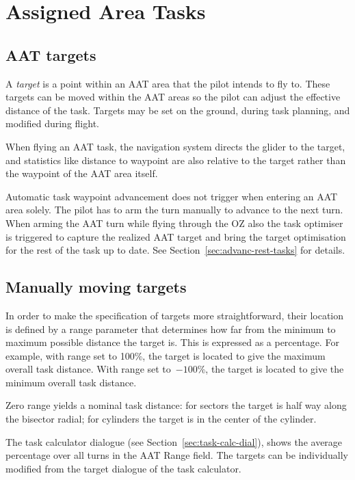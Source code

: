 \section{Assigned Area Tasks}\label{sec:aat-tasks}

\subsection*{AAT targets}

A \emph{target} is a point within an AAT area that the pilot intends to
fly to.  These targets can be moved within the AAT areas so the pilot
can adjust the effective distance of the task.  Targets may be set on
the ground, during task planning, and modified during flight.

When flying an AAT task, the navigation system directs the glider to
the target, and statistics like distance to waypoint are also relative
to the target rather than the waypoint of the AAT area itself.

Automatic task waypoint advancement does not trigger when entering an
AAT area solely. The pilot has to arm the turn manually to advance to the next
turn. When arming the AAT turn while flying through the OZ also the task
optimiser is triggered to capture the realized AAT target and bring the target
optimisation for the rest of the task up to date. See Section~\ref{sec:advanc-rest-tasks} 
for details.

\subsection*{Manually moving targets}

In order to make the specification of targets more straightforward,
their location is defined by a range parameter that determines how
far from the minimum to maximum possible distance the target is.  This
is expressed as a percentage.  For example, with range set to 100\%,
the target is located to give the maximum overall task distance.  With
range set to~$-100$\%, the target is located to give the minimum overall
task distance.  

Zero range yields a nominal task distance: for sectors the target is
half way along the bisector radial; for cylinders the target is in the
center of the cylinder.

The task calculator dialogue (see Section~\ref{sec:task-calc-dial}), shows the
average percentage over all turns in the AAT Range field.
The targets can be individually modified from the target dialogue of the task
calculator.


